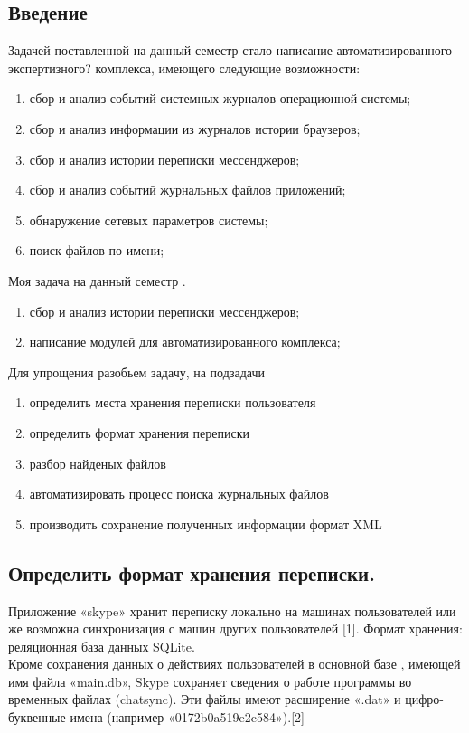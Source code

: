 \newpage

\subsection{Введение}

Задачей поставленной на данный семестр стало написание автоматизированного экспертизного? комплекса, имеющего следующие возможности: 

\begin{enumerate}
\item сбор и анализ событий системных журналов операционной системы;
\item сбор и анализ информации из журналов истории браузеров;
\item сбор и анализ истории переписки мессенджеров;
\item сбор и анализ событий журнальных файлов приложений;
\item обнаружение сетевых параметров системы;
\item поиск файлов по имени;
\end{enumerate}

Моя задача на данный семестр . 

\begin{enumerate}
\item сбор и анализ истории переписки мессенджеров;
\item написание модулей для автоматизированного комплекса;
\end{enumerate}

Для упрощения разобьем задачу, на подзадачи
\begin{enumerate}
\item определить места хранения переписки пользователя
\item определить формат хранения переписки
\item разбор найденых файлов
\item автоматизировать процесс поиска журнальных файлов
\item производить сохранение полученных информации формат XML
\end{enumerate}

\subsection{Определить формат хранения переписки.}

Приложение «skype» хранит переписку локально на машинах пользователей или же возможна синхронизация с машин других пользователей [1]. Формат хранения: реляционная база данных SQLite.\\
Кроме сохранения данных о действиях пользователей
в основной базе , имеющей имя файла «main.db», Skype сохраняет сведения о работе программы во временных файлах (chatsync). Эти файлы имеют расширение «.dat» и цифро-буквенные имена (например «0172b0a519e2c584»).[2]

